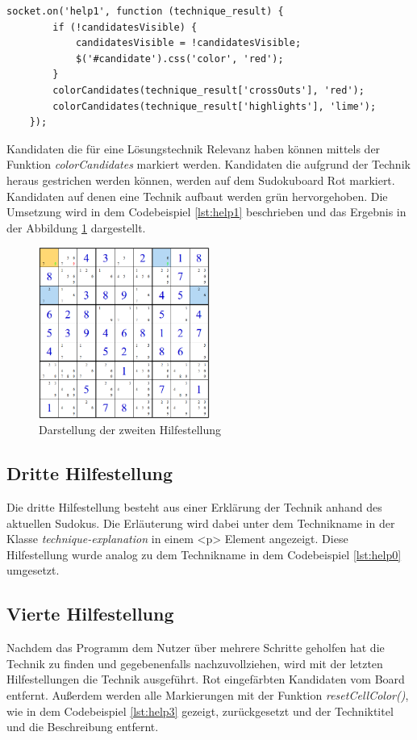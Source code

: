 \begin{lstlisting}[caption={Zweite Hilfestellung}, label={lst:help1}]
	socket.on('help1', function (technique_result) {
		if (!candidatesVisible) {
			candidatesVisible = !candidatesVisible;
			$('#candidate').css('color', 'red');
		}
		colorCandidates(technique_result['crossOuts'], 'red');
		colorCandidates(technique_result['highlights'], 'lime');
	});

\end{lstlisting}

Kandidaten die für eine Lösungstechnik Relevanz haben können mittels der Funktion \textit{colorCandidates} markiert werden. Kandidaten die aufgrund der Technik heraus gestrichen werden können, werden auf dem Sudokuboard Rot markiert. Kandidaten auf denen eine Technik aufbaut werden grün hervorgehoben. Die Umsetzung wird in dem Codebeispiel \ref{lst:help1} beschrieben und das Ergebnis in der Abbildung \ref{fig:Help2} dargestellt.

\begin{figure}[htbp]
	\centering
	\includegraphics[width=0.5\textwidth]{images/Help2.png}
	\caption{Darstellung der zweiten Hilfestellung}
	\label{fig:Help2}
\end{figure}

\subsection{Dritte Hilfestellung}
Die dritte Hilfestellung besteht aus einer Erklärung der Technik anhand des aktuellen Sudokus. Die Erläuterung wird dabei unter dem Technikname in der Klasse \textit{technique-explanation} in einem <p> Element angezeigt. Diese Hilfestellung wurde analog zu dem Technikname in dem Codebeispiel \ref{lst:help0} umgesetzt.

\subsection{Vierte Hilfestellung}
Nachdem das Programm dem Nutzer über mehrere Schritte geholfen hat die Technik zu finden und gegebenenfalls nachzuvollziehen, wird mit der letzten Hilfestellungen die Technik ausgeführt. Rot eingefärbten Kandidaten vom Board entfernt. Außerdem werden alle Markierungen mit der Funktion \textit{resetCellColor()}, wie in dem Codebeispiel \ref{lst:help3} gezeigt, zurückgesetzt und der Techniktitel und die Beschreibung entfernt. 

